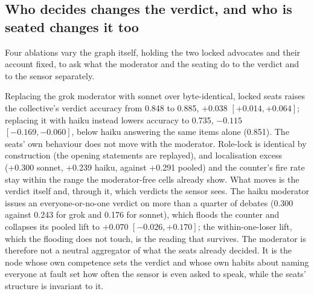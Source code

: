 \subsection{Who decides changes the verdict, and who is seated changes it too}
\label{sec-results-decider}

Four ablations vary the graph itself, holding the two locked advocates and
their account fixed, to ask what the moderator and the seating do to the
verdict and to the sensor separately.

Replacing the grok moderator with sonnet over byte-identical, locked seats
raises the collective's verdict accuracy from 0.848 to 0.885,
$+0.038$ $[+0.014, +0.064]$; replacing it with haiku instead lowers accuracy
to 0.735, $-0.115$ $[-0.169, -0.060]$, below haiku answering the same items
alone (0.851).
The seats' own behaviour does not move with the moderator. Role-lock is
identical by construction (the opening statements are replayed), and
localisation excess (+0.300 sonnet, +0.239 haiku, against +0.291 pooled) and
the counter's fire rate stay within the range the moderator-free cells
already show. What moves is the verdict itself and, through it, which
verdicts the sensor sees. The haiku moderator issues an everyone-or-no-one
verdict on more than a quarter of debates (0.300 against 0.243 for grok and
0.176 for sonnet), which floods the counter and collapses its pooled lift
to $+0.070$ $[-0.026, +0.170]$; the within-one-loser lift, which the
flooding does not touch, is the reading that survives. The moderator is
therefore not a neutral aggregator of what the seats already decided. It is
the node whose own competence sets the verdict and whose own habits about
naming everyone at fault set how often the sensor is even asked to speak,
while the seats' structure is invariant to it.

